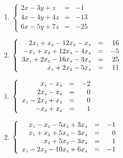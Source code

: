\begin{multicols}{2}
\begin{enumerate}
\setcounter{enumi}{\value{HW}}


\item $\left\{ \begin{array}{rcr} 2x-3y+z & = & -1 \\ 4x-4y+4z & = & -13 \\ 6x-5y+7z & = & -25  \end{array} \right.$

\item  $\left\{ \begin{array}{rcr} 2x_{\mbox{\tiny$1$}} + x_{\mbox{\tiny$2$}} - 12x_{\mbox{\tiny$3$}} -  x_{\mbox{\tiny$4$}} & = & 16 \\ 
-x_{\mbox{\tiny$1$}} + x_{\mbox{\tiny$2$}} + 12x_{\mbox{\tiny$3$}} - 4x_{\mbox{\tiny$4$}} & = & -5  \\  
3x_{\mbox{\tiny$1$}} +  2x_{\mbox{\tiny$2$}} - 16x_{\mbox{\tiny$3$}} - 3x_{\mbox{\tiny$4$}} & = & 25 \\
x_{\mbox{\tiny$1$}} +  2x_{\mbox{\tiny$2$}} - 5x_{\mbox{\tiny$4$}} & = & 11  \end{array} \right.$

\setcounter{HW}{\value{enumi}}
\end{enumerate}
\end{multicols}

\begin{multicols}{2}
\begin{enumerate}
\setcounter{enumi}{\value{HW}}



\item  $\left\{ \begin{array}{rcr} x_{\mbox{\tiny$1$}} - x_{\mbox{\tiny$3$}} & = & -2 \\ 
2x_{\mbox{\tiny$2$}} - x_{\mbox{\tiny$4$}} & = & 0  \\  
x_{\mbox{\tiny$1$}} -  2x_{\mbox{\tiny$2$}} + x_{\mbox{\tiny$3$}} & = & 0 \\
-x_{\mbox{\tiny$3$}} + x_{\mbox{\tiny$4$}} & = & 1  \end{array} \right.$

\item  $\left\{ \begin{array}{rcr} x_{\mbox{\tiny$1$}} - x_{\mbox{\tiny$2$}} - 5x_{\mbox{\tiny$3$}} +  3x_{\mbox{\tiny$4$}} & = & -1 \\ 
x_{\mbox{\tiny$1$}} + x_{\mbox{\tiny$2$}} + 5x_{\mbox{\tiny$3$}} - 3x_{\mbox{\tiny$4$}} & = & 0  \\  
x_{\mbox{\tiny$2$}} + 5x_{\mbox{\tiny$3$}} - 3x_{\mbox{\tiny$4$}} & = & 1 \\
x_{\mbox{\tiny$1$}} -  2x_{\mbox{\tiny$2$}} - 10x_{\mbox{\tiny$3$}} + 6x_{\mbox{\tiny$4$}} & = & -1  \end{array} \right.$ \label{trianglast}

\setcounter{HW}{\value{enumi}}
\end{enumerate}
\end{multicols}


